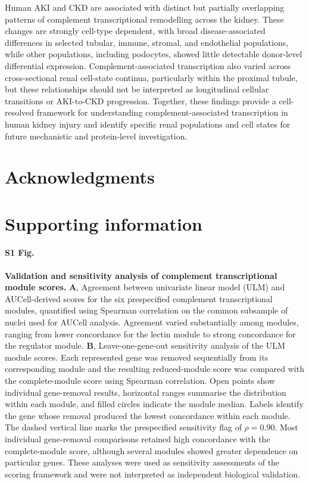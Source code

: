 \documentclass[10pt,letterpaper]{article}
\begin{document}
Human AKI and CKD are associated with distinct but partially overlapping patterns of complement transcriptional remodelling across the kidney. These changes are strongly cell-type dependent, with broad disease-associated differences in selected tubular, immune, stromal, and endothelial populations, while other populations, including podocytes, showed little detectable donor-level differential expression. Complement-associated transcription also varied across cross-sectional renal cell-state continua, particularly within the proximal tubule, but these relationships should not be interpreted as longitudinal cellular transitions or AKI-to-CKD progression. Together, these findings provide a cell-resolved framework for understanding complement-associated transcription in human kidney injury and identify specific renal populations and cell states for future mechanistic and protein-level investigation.

\section*{Acknowledgments}


\nolinenumbers



\section*{Supporting information}


\paragraph*{S1 Fig.}
\label{S1_Fig}
\textbf{Validation and sensitivity analysis of complement transcriptional module scores.}
\textbf{A}, Agreement between univariate linear model (ULM) and AUCell-derived scores for the six prespecified complement transcriptional modules, quantified using Spearman correlation on the common subsample of nuclei used for AUCell analysis. Agreement varied substantially among modules, ranging from lower concordance for the lectin module to strong concordance for the regulator module.
\textbf{B}, Leave-one-gene-out sensitivity analysis of the ULM module scores. Each represented gene was removed sequentially from its corresponding module and the resulting reduced-module score was compared with the complete-module score using Spearman correlation. Open points show individual gene-removal results, horizontal ranges summarise the distribution within each module, and filled circles indicate the module median. Labels identify the gene whose removal produced the lowest concordance within each module. The dashed vertical line marks the prespecified sensitivity flag of $\rho=0.90$. Most individual gene-removal comparisons retained high concordance with the complete-module score, although several modules showed greater dependence on particular genes. These analyses were used as sensitivity assessments of the scoring framework and were not interpreted as independent biological validation.
\end{document}
